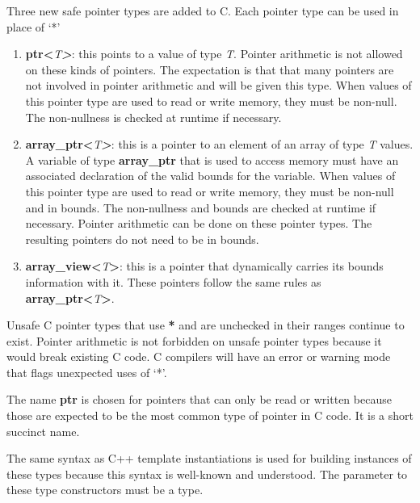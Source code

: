 \documentclass[]{article}
\begin{document}
Three new safe pointer types are added to C. Each pointer type can be
used in place of `*'

\begin{enumerate}
\def\labelenumi{\Roman{enumi}.}
\item
  \textbf{ptr\textless{}}\emph{T\textbf{\textgreater{}}}: this points to
  a value of type \emph{T}. Pointer arithmetic is not allowed on these
  kinds of pointers. The expectation is that that many pointers are not
  involved in pointer arithmetic and will be given this type. When
  values of this pointer type are used to read or write memory, they
  must be non-null. The non-nullness is checked at runtime if necessary.
\item
  \textbf{array\_ptr\textless{}}\emph{T\textbf{\textgreater{}}}: this is
  a pointer to an element of an array of type \emph{T} values. A
  variable of type \textbf{array\_ptr} that is used to access memory
  must have an associated declaration of the valid bounds for the
  variable. When values of this pointer type are used to read or write
  memory, they must be non-null and in bounds. The non-nullness and
  bounds are checked at runtime if necessary. Pointer arithmetic can be
  done on these pointer types. The resulting pointers do not need to be
  in bounds.
\item
  \textbf{array\_view\textless{}}\emph{T}\textbf{\textgreater{}}: this
  is a pointer that dynamically carries its bounds information with it.
  These pointers follow the same rules as
  \textbf{array\_ptr\textless{}}\emph{T}\textbf{\textgreater{}}.
\end{enumerate}

Unsafe C pointer types that use \textbf{*} and are unchecked in their
ranges continue to exist. Pointer arithmetic is not forbidden on unsafe
pointer types because it would break existing C code. C compilers will
have an error or warning mode that flags unexpected uses of `*'.

The name \textbf{ptr} is chosen for pointers that can only be read or
written because those are expected to be the most common type of pointer
in C code. It is a short succinct name.

The same syntax as C++ template instantiations is used for building
instances of these types because this syntax is well-known and
understood. The parameter to these type constructors must be a type.
\end{document}
